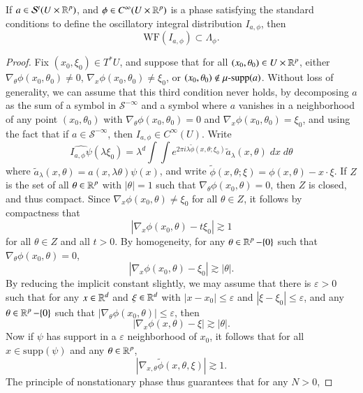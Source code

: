 \begin{theorem}
    If $a \in \mathcal{S}^t(U \times \operatorname{\mathbb{R}}^p)$, and $\phi \in C^\infty(U \times \operatorname{\mathbb{R}}^p)$ is a phase satisfying the standard conditions to define the oscillatory integral distribution $I_{a,\phi}$, then
    \[ \text{WF}(I_{a,\phi}) \subset \Lambda_\phi. \]
\end{theorem}
\begin{proof}
    Fix $(x_0,\xi_0) \in T^* U$, and suppose that for all $(x_0,\theta_0) \in U \times \operatorname{\mathbb{R}}^p$, either $\nabla_\theta \phi(x_0,\theta_0) \neq 0$, $\nabla_x \phi(x_0,\theta_0) \neq \xi_0$, or $(x_0,\theta_0) \not \in \operatorname{\text{$\mu$-supp}}(a)$. Without loss of generality, we can assume that this third condition never holds, by decomposing $a$ as the sum of a symbol in $\mathcal{S}^{-\infty}$ and a symbol where $a$ vanishes in a neighborhood of any point $(x_0,\theta_0)$ with $\nabla_\theta \phi(x_0,\theta_0) = 0$ and $\nabla_x \phi(x_0,\theta_0) = \xi_0$, and using the fact that if $a \in \mathcal{S}^{-\infty}$, then $I_{a,\phi} \in C^\infty(U)$. Write
    \[ \widehat{I_{a,\phi} \psi}(\lambda \xi_0) = \lambda^d \int \int e^{2 \pi i \lambda \tilde{\phi}(x,\theta;\xi_0)} \tilde{a}_\lambda(x,\theta)\; dx\; d\theta \]
    where $\tilde{a}_\lambda(x,\theta) = a(x, \lambda \theta) \psi(x)$, and write $\tilde{\phi}(x,\theta;\xi) = \phi(x,\theta) - x \cdot \xi$. If $Z$ is the set of all $\theta \in \operatorname{\mathbb{R}}^p$ with $|\theta| = 1$ such that $\nabla_\theta \phi(x_0,\theta) = 0$, then $Z$ is closed, and thus compact. Since $\nabla_x \phi(x_0,\theta) \neq \xi_0$ for all $\theta \in Z$, it follows by compactness that
    \[ |\nabla_x \phi(x_0,\theta) - t \xi_0| \gtrsim 1 \]
    for all $\theta \in Z$ and all $t > 0$. By homogeneity, for any $\theta \in \operatorname{\mathbb{R}}^p - \{ 0 \}$ such that $\nabla_\theta \phi(x_0,\theta) = 0$,
    \[ |\nabla_x \phi(x_0,\theta) - \xi_0| \gtrsim |\theta|. \]
    By reducing the implicit constant slightly, we may assume that there is $\varepsilon > 0$ such that for any $x \in \operatorname{\mathbb{R}}^d$ and $\xi \in \operatorname{\mathbb{R}}^d$ with $|x - x_0| \leq \varepsilon$ and $|\xi - \xi_0| \leq \varepsilon$, and any $\theta \in \operatorname{\mathbb{R}}^p - \{ 0 \}$ such that $|\nabla_\theta \phi(x_0,\theta)| \leq \varepsilon$, then
    \[ |\nabla_x \phi(x,\theta) - \xi| \gtrsim |\theta|. \]
    Now if $\psi$ has support in a $\varepsilon$ neighborhood of $x_0$, it follows that for all $x \in \text{supp}(\psi)$ and any $\theta \in \operatorname{\mathbb{R}}^p$,
    \[ |\nabla_{x,\theta} \tilde{\phi}(x,\theta,\xi)| \gtrsim 1. \]
    The principle of nonstationary phase thus guarantees that for any $N > 0$,

\end{proof}
